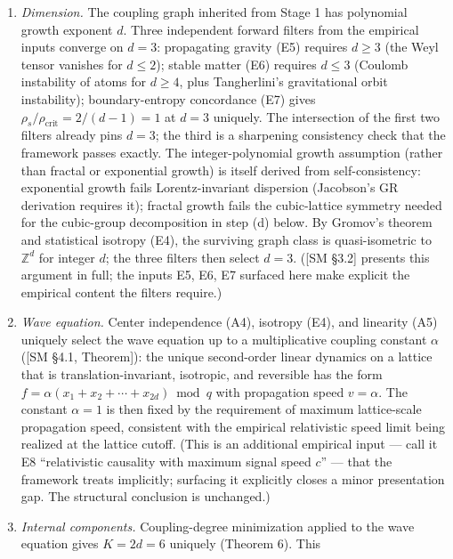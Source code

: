 \documentclass[
]{article}
\begin{document}
\begin{enumerate}
\def\labelenumi{(\alph{enumi})}
\item
  \emph{Dimension.} The coupling graph inherited from Stage 1 has
  polynomial growth exponent \(d\). Three independent forward filters
  from the empirical inputs converge on \(d = 3\): propagating gravity
  (E5) requires \(d \geq 3\) (the Weyl tensor vanishes for
  \(d \leq 2\)); stable matter (E6) requires \(d \leq 3\) (Coulomb
  instability of atoms for \(d \geq 4\), plus Tangherlini's
  gravitational orbit instability); boundary-entropy concordance (E7)
  gives \(\rho_s / \rho_{\text{crit}} = 2/(d-1) = 1\) at \(d = 3\)
  uniquely. The intersection of the first two filters already pins
  \(d = 3\); the third is a sharpening consistency check that the
  framework passes exactly. The integer-polynomial growth assumption
  (rather than fractal or exponential growth) is itself derived from
  self-consistency: exponential growth fails Lorentz-invariant
  dispersion (Jacobson's GR derivation requires it); fractal growth
  fails the cubic-lattice symmetry needed for the cubic-group
  decomposition in step (d) below. By Gromov's theorem and statistical
  isotropy (E4), the surviving graph class is quasi-isometric to
  \(\mathbb{Z}^d\) for integer \(d\); the three filters then select
  \(d = 3\). ({[}SM §3.2{]} presents this argument in full; the inputs
  E5, E6, E7 surfaced here make explicit the empirical content the
  filters require.)
\item
  \emph{Wave equation.} Center independence (A4), isotropy (E4), and
  linearity (A5) uniquely select the wave equation up to a
  multiplicative coupling constant \(\alpha\) ({[}SM §4.1, Theorem{]}):
  the unique second-order linear dynamics on a lattice that is
  translation-invariant, isotropic, and reversible has the form
  \(f = \alpha(x_1 + x_2 + \cdots + x_{2d}) \bmod q\) with propagation
  speed \(v = \alpha\). The constant \(\alpha = 1\) is then fixed by the
  requirement of maximum lattice-scale propagation speed, consistent
  with the empirical relativistic speed limit being realized at the
  lattice cutoff. (This is an additional empirical input --- call it E8
  ``relativistic causality with maximum signal speed \(c\)'' --- that
  the framework treats implicitly; surfacing it explicitly closes a
  minor presentation gap. The structural conclusion is unchanged.)
\item
  \emph{Internal components.} Coupling-degree minimization applied to
  the wave equation gives \(K = 2d = 6\) uniquely (Theorem 6). This

\end{enumerate}
\end{document}
